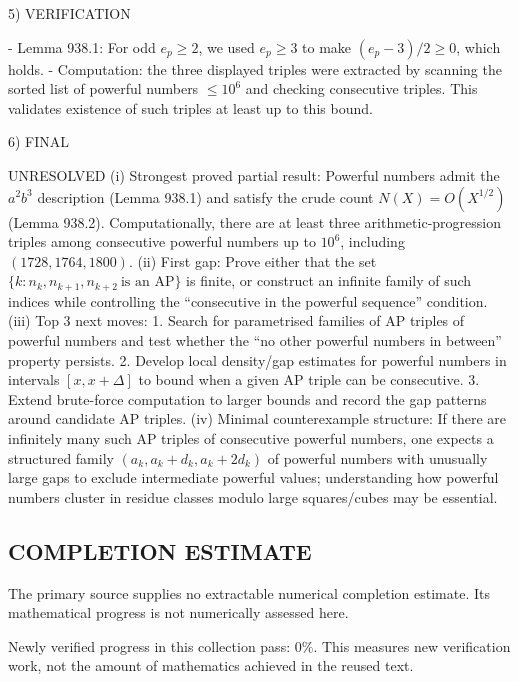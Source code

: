 5) VERIFICATION

- Lemma 938.1: For odd \(e_p\ge2\), we used \(e_p\ge3\) to make \((e_p-3)/2\ge0\), which holds.
- Computation: the three displayed triples were extracted by scanning the sorted list of powerful numbers \(\le 10^6\) and checking consecutive triples. This validates existence of such triples at least up to this bound.

6) FINAL

UNRESOLVED
(i) Strongest proved partial result: Powerful numbers admit the \(a^2b^3\) description (Lemma 938.1) and satisfy the crude count \(N(X)=O(X^{1/2})\) (Lemma 938.2). Computationally, there are at least three arithmetic-progression triples among consecutive powerful numbers up to \(10^6\), including \((1728,1764,1800)\).
(ii) First gap: Prove either that the set \(\{k: n_k,n_{k+1},n_{k+2}\ \text{is an AP}\}\) is finite, or construct an infinite family of such indices while controlling the ``consecutive in the powerful sequence'' condition.
(iii) Top 3 next moves:
  1. Search for parametrised families of AP triples of powerful numbers and test whether the ``no other powerful numbers in between'' property persists.
  2. Develop local density/gap estimates for powerful numbers in intervals \([x,x+\Delta]\) to bound when a given AP triple can be consecutive.
  3. Extend brute-force computation to larger bounds and record the gap patterns around candidate AP triples.
(iv) Minimal counterexample structure: If there are infinitely many such AP triples of consecutive powerful numbers, one expects a structured family \((a_k, a_k+d_k, a_k+2d_k)\) of powerful numbers with unusually large gaps to exclude intermediate powerful values; understanding how powerful numbers cluster in residue classes modulo large squares/cubes may be essential.




\subsection*{COMPLETION ESTIMATE}
The primary source supplies no extractable numerical completion estimate. Its mathematical progress is not numerically assessed here.

Newly verified progress in this collection pass: $0\%$. This measures new verification work, not the amount of mathematics achieved in the reused text.
